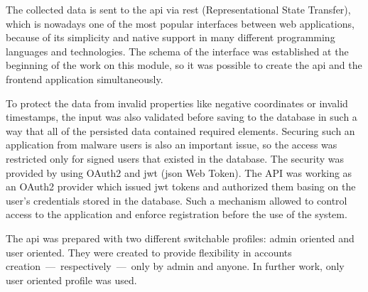The collected data is sent to the \gls{api} via \gls{rest} (Representational State Transfer), which is nowadays one of the most popular interfaces between web applications, because of its simplicity and native support in many different programming languages and technologies.
The schema of the interface was established at the beginning of the work on this module, so it was possible to create the \gls{api} and the frontend application simultaneously.

To protect the data from invalid properties like negative coordinates or invalid timestamps, the input was also validated before saving to the database in such a way that all of the persisted data contained required elements.
Securing such an application from malware users is also an important issue, so the access was restricted only for signed users that existed in the database.
The security was provided by using OAuth2 and \gls{jwt} (\gls{json} Web Token).
The API was working as an OAuth2 provider which issued \gls{jwt} tokens and authorized them basing on the user's credentials stored in the database.
Such a mechanism allowed to control access to the application and enforce registration before the use of the system.

The \gls{api} was prepared with two different switchable profiles: admin oriented and user oriented.
They were created to provide flexibility in accounts creation~---~respectively~---~only by admin and anyone.
In further work, only user oriented profile was used.